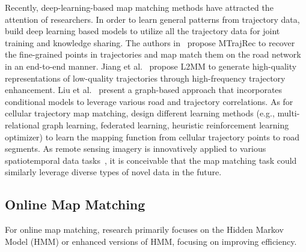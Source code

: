 Recently, deep-learning-based map matching methods have attracted the attention of researchers. 
In order to learn general patterns from trajectory data, \cite{deepmmzhao, deepmmfeng} build deep learning based models to utilize all the trajectory data for joint training and knowledge sharing. 
The authors in~\cite{mtrajrec} propose MTrajRec to recover the fine-grained points in trajectories and map match them on the road network in an end-to-end manner. 
Jiang et al.~\cite{l2mm} propose L2MM to generate high-quality representations of low-quality trajectories through high-frequency trajectory enhancement. 
Liu et al.~\cite{graphmm} present a graph-based approach that incorporates conditional models to leverage various road and trajectory correlations. 
As for cellular trajectory map matching, \cite{LHMM, FL-AMM, DMM2} design different learning methods (e.g., multi-relational graph learning, federated learning, heuristic reinforcement learning optimizer) to learn the mapping function from cellular trajectory points to road segments. As remote sensing imagery is innovatively applied to various spatiotemporal data tasks~\cite{POIjn,urbancmx}, it is conceivable that the map matching task could similarly leverage diverse types of novel data in the future.


\subsection{Online Map Matching}
For online map matching, research primarily focuses on the Hidden Markov Model (HMM) or enhanced versions of HMM, focusing on improving efficiency.

